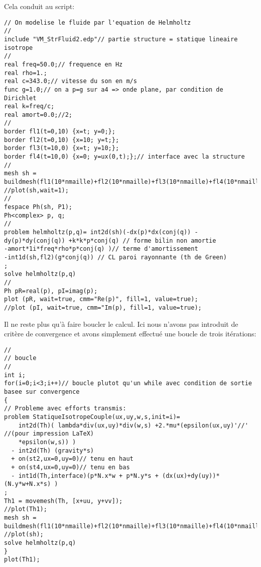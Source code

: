 \medskip
Cela conduit au script:
\begin{lstlisting}[firstnumber=33]
// On modelise le fluide par l'equation de Helmholtz
//
include "VM_StrFluid2.edp"// partie structure = statique lineaire isotrope
//
real freq=50.0;// frequence en Hz
real rho=1.;
real c=343.0;// vitesse du son en m/s
func g=1.0;// on a p=g sur a4 => onde plane, par condition de Dirichlet
real k=freq/c;
real amort=0.0;//2;
//
border fl1(t=0,10) {x=t; y=0;};
border fl2(t=0,10) {x=10; y=t;};
border fl3(t=10,0) {x=t; y=10;};
border fl4(t=10,0) {x=0; y=ux(0,t);};// interface avec la structure
//
mesh sh = buildmesh(fl1(10*nmaille)+fl2(10*nmaille)+fl3(10*nmaille)+fl4(10*nmaille));
//plot(sh,wait=1);
//
fespace Ph(sh, P1);
Ph<complex> p, q;
//
problem helmholtz(p,q)= int2d(sh)(-dx(p)*dx(conj(q)) - dy(p)*dy(conj(q)) +k*k*p*conj(q) // forme bilin non amortie
-amort*1i*freq*rho*p*conj(q) )// terme d'amortissement
-int1d(sh,fl2)(g*conj(q)) // CL paroi rayonnante (th de Green)
;
solve helmholtz(p,q)
//
Ph pR=real(p), pI=imag(p);
plot (pR, wait=true, cmm="Re(p)", fill=1, value=true);
//plot (pI, wait=true, cmm="Im(p), fill=1, value=true);
\end{lstlisting}

\medskip
Il ne reste plus qu'à faire boucler le calcul. Ici nous n'avons pas introduit de critère de convergence et avons simplement effectué une boucle de trois itérations:
\begin{lstlisting}[firstnumber=last]
//
// boucle
//
int i;
for(i=0;i<3;i++)// boucle plutot qu'un while avec condition de sortie basee sur convergence
{
// Probleme avec efforts transmis:
problem StatiqueIsotropeCouple(ux,uy,w,s,init=i)=
	int2d(Th)( lambda*div(ux,uy)*div(w,s) +2.*mu*(epsilon(ux,uy)'//' //(pour impression LaTeX)
	*epsilon(w,s)) )
  - int2d(Th) (gravity*s)
  + on(st2,ux=0,uy=0)// tenu en haut
  + on(st4,ux=0,uy=0)// tenu en bas
  - int1d(Th,interface)(p*N.x*w + p*N.y*s + (dx(ux)+dy(uy))*(N.y*w+N.x*s) )
;
Th1 = movemesh(Th, [x+uu, y+vv]);
//plot(Th1);
mesh sh = buildmesh(fl1(10*nmaille)+fl2(10*nmaille)+fl3(10*nmaille)+fl4(10*nmaille));
//plot(sh);
solve helmholtz(p,q)
}
plot(Th1);
\end{lstlisting}
